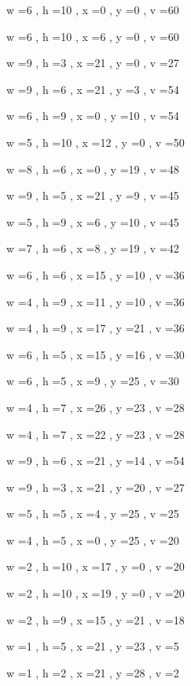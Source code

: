 \documentclass[11pt]{article}
\begin{document}
w =6 , h =10 , x =0 , y =0 , v =60
\par
w =6 , h =10 , x =6 , y =0 , v =60
\par
w =9 , h =3 , x =21 , y =0 , v =27
\par
w =9 , h =6 , x =21 , y =3 , v =54
\par
w =6 , h =9 , x =0 , y =10 , v =54
\par
w =5 , h =10 , x =12 , y =0 , v =50
\par
w =8 , h =6 , x =0 , y =19 , v =48
\par
w =9 , h =5 , x =21 , y =9 , v =45
\par
w =5 , h =9 , x =6 , y =10 , v =45
\par
w =7 , h =6 , x =8 , y =19 , v =42
\par
w =6 , h =6 , x =15 , y =10 , v =36
\par
w =4 , h =9 , x =11 , y =10 , v =36
\par
w =4 , h =9 , x =17 , y =21 , v =36
\par
w =6 , h =5 , x =15 , y =16 , v =30
\par
w =6 , h =5 , x =9 , y =25 , v =30
\par
w =4 , h =7 , x =26 , y =23 , v =28
\par
w =4 , h =7 , x =22 , y =23 , v =28
\par
w =9 , h =6 , x =21 , y =14 , v =54
\par
w =9 , h =3 , x =21 , y =20 , v =27
\par
w =5 , h =5 , x =4 , y =25 , v =25
\par
w =4 , h =5 , x =0 , y =25 , v =20
\par
w =2 , h =10 , x =17 , y =0 , v =20
\par
w =2 , h =10 , x =19 , y =0 , v =20
\par
w =2 , h =9 , x =15 , y =21 , v =18
\par
w =1 , h =5 , x =21 , y =23 , v =5
\par
w =1 , h =2 , x =21 , y =28 , v =2
\par
\newpage
\end{document}
